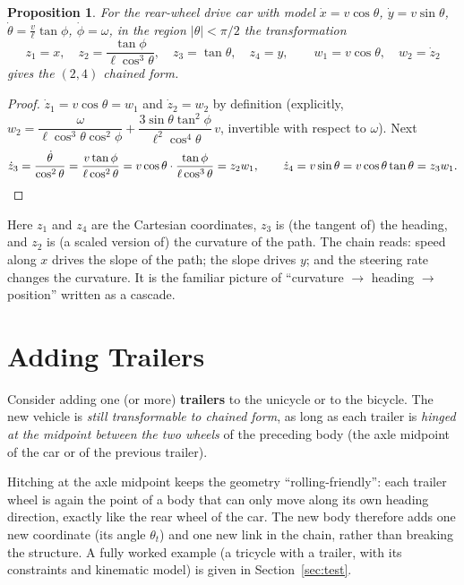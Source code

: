 \documentclass[11pt,a4paper]{article}
\theoremstyle{definition}
\theoremstyle{plain}
\newtheorem{proposition}[definition]{Proposition}
\begin{document}
\begin{proposition}\label{prop:bicycle}
For the rear-wheel drive car with model $\dot x=v\cos\theta$, $\dot y=v\sin\theta$, $\dot\theta=\tfrac{v}{\ell}\tan\phi$, $\dot\phi=\omega$, in the region $|\theta|<\pi/2$ the transformation
\[
 z_1=x,\quad z_2=\frac{\tan\phi}{\ell\cos^3\theta},\quad z_3=\tan\theta,\quad z_4=y,
 \qquad w_1=v\cos\theta,\quad w_2=\dot z_2
\]
gives the $(2,4)$ chained form.
\end{proposition}
\begin{proof}
$\dot z_1=v\cos\theta=w_1$ and $\dot z_2=w_2$ by definition (explicitly, $w_2=\dfrac{\omega}{\ell\cos^3\theta\cos^2\phi}+\dfrac{3\sin\theta\tan^2\phi}{\ell^2\cos^4\theta}\,v$, invertible with respect to $\omega$). Next
\[
 \dot z_3=\frac{\dot\theta}{\cos^2\theta}=\frac{v\tan\phi}{\ell\cos^2\theta}=v\cos\theta\cdot\frac{\tan\phi}{\ell\cos^3\theta}=z_2w_1,
\qquad
 \dot z_4=v\sin\theta=v\cos\theta\tan\theta=z_3w_1 .\qedhere
\]
\end{proof}

\begin{intuition}
Here $z_1$ and $z_4$ are the Cartesian coordinates, $z_3$ is (the tangent of) the heading, and $z_2$ is (a scaled version of) the curvature of the path. The chain reads: speed along $x$ drives the slope of the path; the slope drives $y$; and the steering rate changes the curvature. It is the familiar picture of ``curvature $\to$ heading $\to$ position'' written as a cascade.
\end{intuition}

\section{Adding Trailers}

Consider adding one (or more) \textbf{trailers} to the unicycle or to the bicycle. The new vehicle is \emph{still transformable to chained form}, as long as each trailer is \emph{hinged at the midpoint between the two wheels} of the preceding body (the axle midpoint of the car or of the previous trailer).

\begin{intuition}
Hitching at the axle midpoint keeps the geometry ``rolling-friendly'': each trailer wheel is again the point of a body that can only move along its own heading direction, exactly like the rear wheel of the car. The new body therefore adds one new coordinate (its angle $\theta_t$) and one new link in the chain, rather than breaking the structure. A fully worked example (a tricycle with a trailer, with its constraints and kinematic model) is given in Section~\ref{sec:test}.
\end{intuition}
\end{document}
